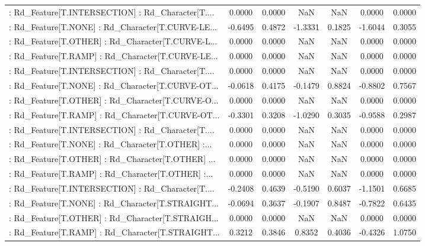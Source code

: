 \begin{longtable}{p{4cm}cccccc}
 : Rd\_Feature[T.INTERSECTION] : Rd\_Character[T.... &  0.0000 &    0.0000 &     NaN &          NaN &  0.0000 &  0.0000 \\
 : Rd\_Feature[T.NONE] : Rd\_Character[T.CURVE-LE... & -0.6495 &    0.4872 & -1.3331 &       0.1825 & -1.6044 &  0.3055 \\
 : Rd\_Feature[T.OTHER] : Rd\_Character[T.CURVE-L... &  0.0000 &    0.0000 &     NaN &          NaN &  0.0000 &  0.0000 \\
 : Rd\_Feature[T.RAMP] : Rd\_Character[T.CURVE-LE... &  0.0000 &    0.0000 &     NaN &          NaN &  0.0000 &  0.0000 \\
 : Rd\_Feature[T.INTERSECTION] : Rd\_Character[T.... &  0.0000 &    0.0000 &     NaN &          NaN &  0.0000 &  0.0000 \\
 : Rd\_Feature[T.NONE] : Rd\_Character[T.CURVE-OT... & -0.0618 &    0.4175 & -0.1479 &       0.8824 & -0.8802 &  0.7567 \\
 : Rd\_Feature[T.OTHER] : Rd\_Character[T.CURVE-O... &  0.0000 &    0.0000 &     NaN &          NaN &  0.0000 &  0.0000 \\
 : Rd\_Feature[T.RAMP] : Rd\_Character[T.CURVE-OT... & -0.3301 &    0.3208 & -1.0290 &       0.3035 & -0.9588 &  0.2987 \\
 : Rd\_Feature[T.INTERSECTION] : Rd\_Character[T.... &  0.0000 &    0.0000 &     NaN &          NaN &  0.0000 &  0.0000 \\
 : Rd\_Feature[T.NONE] : Rd\_Character[T.OTHER] :... &  0.0000 &    0.0000 &     NaN &          NaN &  0.0000 &  0.0000 \\
 : Rd\_Feature[T.OTHER] : Rd\_Character[T.OTHER] ... &  0.0000 &    0.0000 &     NaN &          NaN &  0.0000 &  0.0000 \\
 : Rd\_Feature[T.RAMP] : Rd\_Character[T.OTHER] :... &  0.0000 &    0.0000 &     NaN &          NaN &  0.0000 &  0.0000 \\
 : Rd\_Feature[T.INTERSECTION] : Rd\_Character[T.... & -0.2408 &    0.4639 & -0.5190 &       0.6037 & -1.1501 &  0.6685 \\
 : Rd\_Feature[T.NONE] : Rd\_Character[T.STRAIGHT... & -0.0694 &    0.3637 & -0.1907 &       0.8487 & -0.7822 &  0.6435 \\
 : Rd\_Feature[T.OTHER] : Rd\_Character[T.STRAIGH... &  0.0000 &    0.0000 &     NaN &          NaN &  0.0000 &  0.0000 \\
 : Rd\_Feature[T.RAMP] : Rd\_Character[T.STRAIGHT... &  0.3212 &    0.3846 &  0.8352 &       0.4036 & -0.4326 &  1.0750 \\

\end{longtable}
